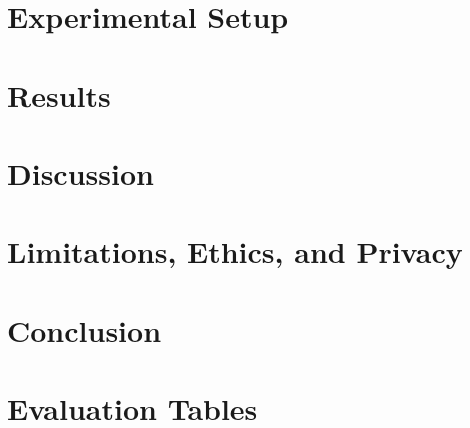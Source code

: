 \documentclass[journal]{IEEEtran}
\begin{document}
\section{Experimental Setup}
\label{sec:setup}


\section{Results}
\label{sec:results}


\section{Discussion}
\label{sec:discussion}


\section{Limitations, Ethics, and Privacy}
\label{sec:limitations}


\section{Conclusion}
\label{sec:conclusion}


\appendices
\section{Evaluation Tables}






\end{document}
